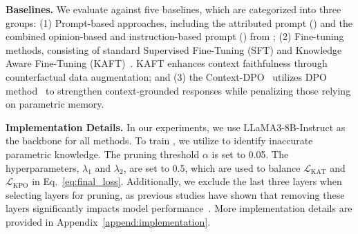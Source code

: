 \textbf{Baselines.}
We evaluate \method{} against five baselines, which are categorized into three groups: (1) Prompt-based approaches, including the attributed prompt (\attrprompt) and the combined opinion-based and instruction-based prompt (\oiprompt) from \citet{zhou2023context}; (2)  Fine-tuning methods, consisting of standard Supervised Fine-Tuning (SFT) and Knowledge Aware Fine-Tuning (KAFT)~\cite{li2022large}. KAFT enhances context faithfulness through counterfactual data augmentation; and (3) the Context-DPO~\cite{bi2024context} utilizes DPO method~\cite{rafailov2023direct} to strengthen context-grounded responses while penalizing those relying on parametric memory.

\textbf{Implementation Details.}
In our experiments, we use LLaMA3-8B-Instruct as the backbone for all methods. To train \method{}, we utilize \dataset{} to identify inaccurate parametric knowledge. The pruning threshold $\alpha$ is set to 0.05. The hyperparameters, $\lambda_1$ and $\lambda_2$, are set to 0.5, which are used to balance $\mathcal{L}_{\text{KAT}}$ and $\mathcal{L}_{\text{KPO}}$ in Eq.~\ref{eq:final_loss}. Additionally, we exclude the last three layers when selecting layers for pruning, as previous studies have shown that removing these layers significantly impacts model performance~\cite{lad2024remarkable,chen2024compressing,zhang2024finercut}. More implementation details are provided in Appendix~\ref{append:implementation}.



